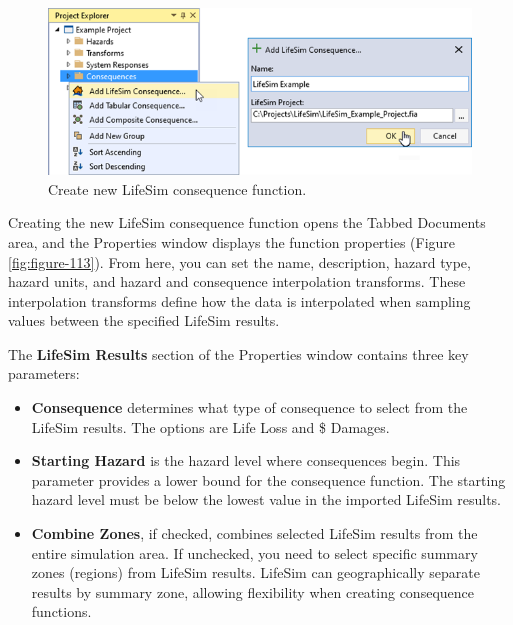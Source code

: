 \documentclass[
]{book}
\begin{document}
\begin{figure}

{\centering \includegraphics{images/figure112} 

}

\caption{Create new LifeSim consequence function.}\label{fig:figure-112}
\end{figure}

Creating the new LifeSim consequence function opens the Tabbed Documents area, and the Properties window displays the function properties (Figure \ref{fig:figure-113}). From here, you can set the name, description, hazard type, hazard units, and hazard and consequence interpolation transforms. These interpolation transforms define how the data is interpolated when sampling values between the specified LifeSim results.

The \textbf{LifeSim Results} section of the Properties window contains three key parameters:

\begin{itemize}
\item
  \textbf{Consequence} determines what type of consequence to select from the LifeSim results. The options are Life Loss and \$ Damages.
\item
  \textbf{Starting Hazard} is the hazard level where consequences begin. This parameter provides a lower bound for the consequence function. The starting hazard level must be below the lowest value in the imported LifeSim results.
\item
  \textbf{Combine Zones}, if checked, combines selected LifeSim results from the entire simulation area. If unchecked, you need to select specific summary zones (regions) from LifeSim results. LifeSim can geographically separate results by summary zone, allowing flexibility when creating consequence functions.
\end{itemize}
\end{document}

